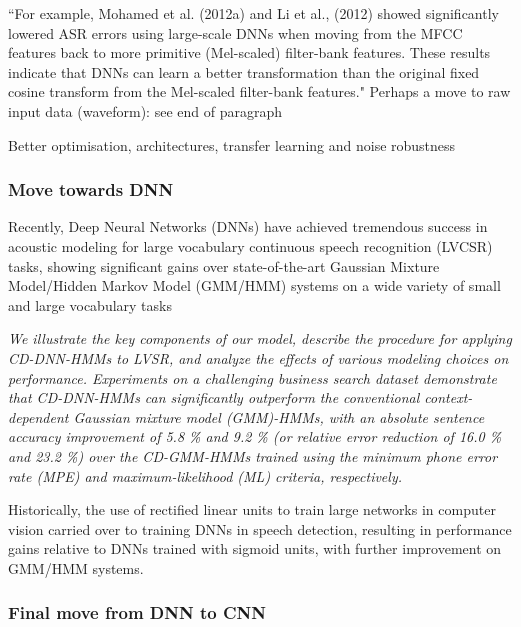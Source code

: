 \documentclass[12pt]{llncs}
\begin{document}
``For example, Mohamed et al. (2012a) \cite[firstExampleMovingGMMsectionofHMM/GMMtoDNN]{mohamed2012acoustic} and Li et al., (2012) showed
significantly lowered ASR errors using large-scale DNNs when moving from the MFCC features back to
more primitive (Mel-scaled) filter-bank features. These results indicate that DNNs can learn a better
transformation than the original fixed cosine transform from the Mel-scaled filter-bank features."
Perhaps a move to raw input data (waveform): see end of paragraph

Better optimisation, architectures, transfer learning and noise robustness

\subsubsection{Move towards DNN}

Recently, Deep Neural Networks (DNNs) have achieved tremendous
success in acoustic modeling for large vocabulary continuous
speech recognition (LVCSR) tasks, showing significant gains over
state-of-the-art Gaussian Mixture Model/Hidden Markov Model
(GMM/HMM) systems on a wide variety of small and large vocabulary
tasks 


\cite{dahl2012context}
\emph{We illustrate the key components of our model, describe the procedure for applying CD-DNN-HMMs to LVSR, and analyze the effects of various modeling choices on performance. Experiments on a challenging
business search dataset demonstrate that CD-DNN-HMMs
can significantly outperform the conventional context-dependent
Gaussian mixture model (GMM)-HMMs, with an absolute sentence
accuracy improvement of 5.8 \% and 9.2 \% (or relative error
reduction of 16.0 \% and 23.2 \%) over the CD-GMM-HMMs trained
using the minimum phone error rate (MPE) and maximum-likelihood
(ML) criteria, respectively.}


Historically, the use of rectified linear units to train large networks in computer vision carried over to training DNNs in speech detection, resulting in performance gains relative to DNNs trained with sigmoid units, with further improvement on GMM/HMM systems. \cite{dahl2013improving}




\subsubsection{Final move from DNN to CNN}
\end{document}
